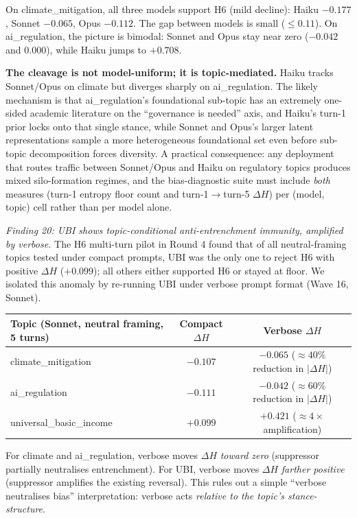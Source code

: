 \documentclass[12pt,a4paper]{article}
\begin{document}
On climate\_mitigation, all three models support H6 (mild decline): Haiku $-0.177$, Sonnet $-0.065$, Opus $-0.112$.
The gap between models is small ($\le 0.11$).
On ai\_regulation, the picture is bimodal: Sonnet and Opus stay near zero ($-0.042$ and $0.000$), while Haiku jumps to $+0.708$.

\textbf{The cleavage is not model-uniform; it is topic-mediated.}
Haiku tracks Sonnet/Opus on climate but diverges sharply on ai\_regulation.
The likely mechanism is that ai\_regulation's foundational sub-topic has an extremely one-sided academic literature on the ``governance is needed'' axis, and Haiku's turn-1 prior locks onto that single stance, while Sonnet and Opus's larger latent representations sample a more heterogeneous foundational set even before sub-topic decomposition forces diversity.
A practical consequence: any deployment that routes traffic between Sonnet/Opus and Haiku on regulatory topics produces mixed silo-formation regimes, and the bias-diagnostic suite must include \emph{both} measures (turn-1 entropy floor count and turn-1$\to$turn-5 $\Delta H$) per (model, topic) cell rather than per model alone.

\emph{Finding 20: UBI shows topic-conditional anti-entrenchment immunity, amplified by verbose.}
The H6 multi-turn pilot in Round 4 found that of all neutral-framing topics tested under compact prompts, UBI was the only one to reject H6 with positive $\Delta H$ ($+0.099$); all others either supported H6 or stayed at floor.
We isolated this anomaly by re-running UBI under verbose prompt format (Wave 16, Sonnet).

\begin{center}
\begin{tabular}{lcc}
\toprule
Topic (Sonnet, neutral framing, 5 turns) & Compact $\Delta H$ & Verbose $\Delta H$ \\
\midrule
climate\_mitigation & $-0.107$ & $-0.065$ ($\approx 40\%$ reduction in $|\Delta H|$) \\
ai\_regulation & $-0.111$ & $-0.042$ ($\approx 60\%$ reduction in $|\Delta H|$) \\
universal\_basic\_income & $+0.099$ & $+0.421$ ($\approx 4\times$ amplification) \\
\bottomrule
\end{tabular}
\end{center}

For climate and ai\_regulation, verbose moves $\Delta H$ \emph{toward zero} (suppressor partially neutralises entrenchment).
For UBI, verbose moves $\Delta H$ \emph{farther positive} (suppressor amplifies the existing reversal).
This rules out a simple ``verbose neutralises bias'' interpretation: verbose acts \emph{relative to the topic's stance-structure}.
\end{document}
